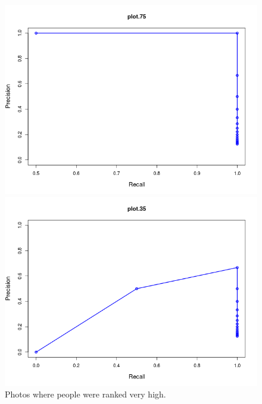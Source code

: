 \begin{figure}[t]

\begin{minipage}[b]{0.5\linewidth}
\centering
\includegraphics[width=\textwidth]{media/chapter6/pr-graphs/plot-75.png}

\end{minipage}
\hspace{0.5cm}
\begin{minipage}[b]{0.5\linewidth}
\centering
\includegraphics[width=\textwidth]{media/chapter6/pr-graphs/plot-35.png}
\end{minipage}
\caption{Photos where people were ranked very high.}
\label{fig:good}


\end{figure}
